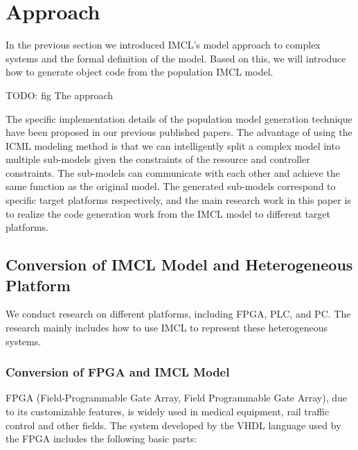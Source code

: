 \section{Approach}
In the previous section we introduced IMCL's model approach to complex systems and the formal definition of the model. Based on this, we will introduce how to generate object code from the population IMCL model. 

TODO: fig The approach 

The specific implementation details of the population model generation technique have been proposed in our previous published papers. The advantage of using the ICML modeling method is that we can intelligently split a complex model into multiple sub-models given the constraints of the resource and controller constraints. The sub-models can communicate with each other and achieve the same function as the original model. The generated sub-models correspond to specific target platforms respectively, and the main research work in this paper is to realize the code generation work from the IMCL model to different target platforms.


\subsection{Conversion of IMCL Model and Heterogeneous Platform}
We conduct research on different platforms, including FPGA, PLC, and PC. The research mainly includes how to use IMCL to represent these heterogeneous systems.

\subsubsection{\textbf{Conversion of FPGA and IMCL Model}}
FPGA (Field-Programmable Gate Array, Field Programmable Gate Array), due to its customizable features, is widely used in medical equipment, rail traffic control and other fields. The system developed by the VHDL language used by the FPGA includes the following basic parts:

